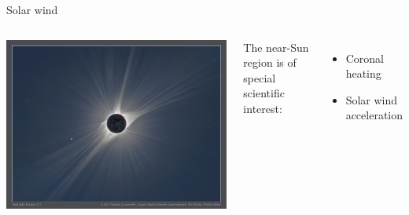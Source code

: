 \begin{frame}[plain,c]{Solar wind}{}
	\begin{columns}[c]
		
		\hspace*{-17pt}
		\includegraphics[width=\textwidth]{../talk_figures/TSE_2017_200mm_Whiskey_m-d.png}
		
		
		The near-Sun region is of special scientific interest:\\
		\begin{itemize}
			\item Coronal heating
			\item Solar wind acceleration
		\end{itemize}
		
	\end{columns}
\end{frame}

